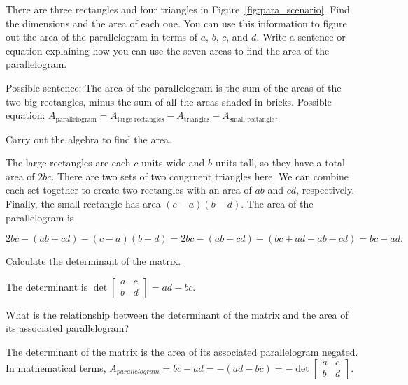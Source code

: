 \documentclass[../key.tex]{subfiles}
\begin{document}
\begin{inner_problem}
\item There are three rectangles and four triangles in Figure~\ref{fig:para_scenario}. Find the dimensions and the area of each one. You can use this information to figure out the area of the parallelogram in terms of $a$, $b$, $c$, and $d$. Write a sentence or equation explaining how you can use the seven areas to find the area of the parallelogram.
\end{inner_problem}

Possible sentence: The area of the parallelogram is the sum of the areas of the two big rectangles, minus the sum of all the areas shaded in bricks.
Possible equation: $A_{\text{parallelogram}}=A_{\text{large rectangles}}-A_{\text{triangles}}-A_{\text{small rectangle}}.$

\begin{inner_problem}
\item Carry out the algebra to find the area.
\end{inner_problem}

The large rectangles are each $c$ units wide and $b$ units tall, so they have a total area of $2bc$. There are two sets of two congruent triangles here. We can combine each set together to create two rectangles with an area of $ab$ and $cd$, respectively. Finally, the small rectangle has area $(c-a)(b-d)$. The area of the parallelogram is

$$2bc-(ab+cd)-(c-a)(b-d) = 2bc-(ab+cd) - (bc+ad-ab-cd) = bc-ad.$$

\begin{inner_problem}
\item Calculate the determinant of the matrix.
\end{inner_problem}

The determinant is $\det \begin{bmatrix} a & c \\ b & d \end{bmatrix} =ad-bc$.

\begin{inner_problem}
\item What is the relationship between the determinant of the matrix and the area of its associated parallelogram?
\end{inner_problem}

The determinant of the matrix is the area of its associated parallelogram negated. In mathematical terms, $A_{parallelogram}=bc-ad = -(ad-bc) = -\det \begin{bmatrix} a & c \\ b & d \end{bmatrix}$.
\end{document}
